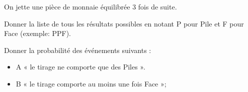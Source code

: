 \exo{}

On jette une pièce de monnaie équilibrée 3 fois de suite.

\question{} 
Donner la liste de tous les résultats possibles en notant P pour Pile et F pour Face (exemple: PPF).

\question{} 
Donner la probabilité des événements suivants :

\begin{itemize}
\item A « le tirage ne comporte que des Piles ».
\item B « le tirage comporte au moins une fois Face »;
\end{itemize}

